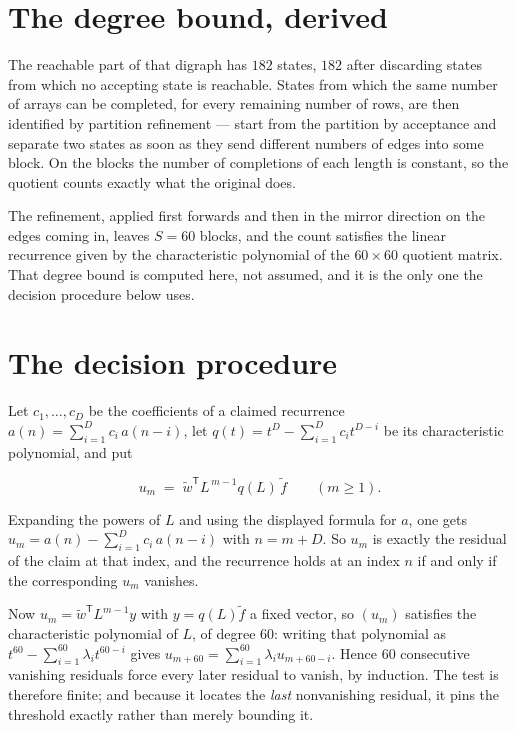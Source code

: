 \documentclass[11pt]{article}
\theoremstyle{definition}
\begin{document}
\section{The degree bound, derived}

The reachable part of that digraph has $182$ states, $182$ after discarding states from which no accepting state is reachable. States from which the same number of arrays can be completed, for every remaining number of rows, are then identified by partition refinement --- start from the partition by acceptance and separate two states as soon as they send different numbers of edges into some block. On the blocks the number of completions of each length is constant, so the quotient counts exactly what the original does.

The refinement, applied first forwards and then in the mirror direction on the edges coming in, leaves $S = 60$ blocks, and the count satisfies the linear recurrence given by the characteristic polynomial of the $60 \times 60$ quotient matrix. That degree bound is computed here, not assumed, and it is the only one the decision procedure below uses.

\section{The decision procedure}

Let $c_1,\dots,c_D$ be the coefficients of a claimed recurrence $a(n) = \sum_{i=1}^{D} c_i\,a(n-i)$, let $q(t) = t^{D} - \sum_{i=1}^{D} c_i t^{D-i}$ be its characteristic polynomial, and put

\[u_m \;=\; \tilde w^{\mathsf T} L^{\,m-1} q(L)\,\tilde f \qquad (m \ge 1).\]

Expanding the powers of $L$ and using the displayed formula for $a$, one gets $u_m = a(n) - \sum_{i=1}^{D} c_i\,a(n-i)$ with $n = m + D$. So $u_m$ is exactly the residual of the claim at that index, and the recurrence holds at an index $n$ if and only if the corresponding $u_m$ vanishes.

Now $u_m = \tilde w^{\mathsf T} L^{m-1} y$ with $y = q(L)\tilde f$ a fixed vector, so $(u_m)$ satisfies the characteristic polynomial of $L$, of degree $60$: writing that polynomial as $t^{60} - \sum_{i=1}^{60} \lambda_i t^{60-i}$ gives $u_{m+60} = \sum_{i=1}^{60} \lambda_i u_{m+60-i}$. Hence $60$ consecutive vanishing residuals force every later residual to vanish, by induction. The test is therefore finite; and because it locates the {\itshape last} nonvanishing residual, it pins the threshold exactly rather than merely bounding it.
\end{document}
